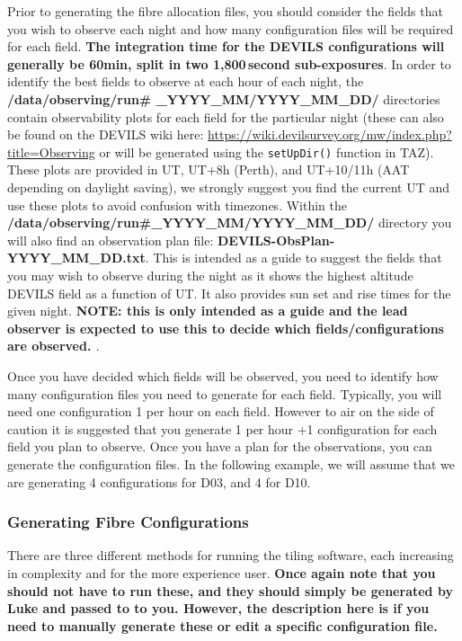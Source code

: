 \documentclass[12pt]{article}
\begin{document}
Prior to generating the fibre allocation files, you should consider the fields that you wish to observe each night and how many configuration files will be required for each field. \textbf{The integration time for the DEVILS configurations will generally be 60min, split in two 1,800\,second sub-exposures}. In order to identify the best fields to observe at each hour of each night, the \textbf{/data/observing/run\# \_YYYY\_MM/YYYY\_MM\_DD/} directories contain observability plots for each field for the particular night (these can also be found on the DEVILS wiki here: \url{https://wiki.devilsurvey.org/mw/index.php?title=Observing} or will be generated using the \texttt{setUpDir()} function in TAZ). These plots are provided in UT, UT+8h (Perth), and UT+10/11h (AAT depending on daylight saving), we strongly suggest you find the current UT and use these plots to avoid confusion with timezones. Within the \textbf{/data/observing/run\#\_YYYY\_MM/YYYY\_MM\_DD/}  directory you will also find an observation plan file: \textbf{DEVILS-ObsPlan-YYYY\_MM\_DD.txt}. This is intended as a guide to suggest the fields that you may wish to observe during the night as it shows the highest altitude DEVILS field as a function of UT. It also provides sun set and rise times for the given night. \textbf{\textcolor{PineGreen}{NOTE:
 this is only intended as a guide and the lead observer is expected to use this to decide which fields/configurations are observed. }}.

Once you have decided which fields will be observed, you need to identify how many configuration files you need to generate for each field. Typically, you will need one configuration 1 per hour on each field. However to air on the side of caution it is suggested that you generate 1 per hour +1 configuration for each field you plan to observe. Once you have a plan for the observations, you can generate the configuration files. In the following example, we will assume that we are generating 4 configurations for D03, and 4 for D10.      


\subsubsection{Generating Fibre Configurations}

There are three different methods for running the tiling software, each increasing in complexity and for the more experience user. \textbf{\textcolor{PineGreen}{Once again note that you should not have to run these, and they should simply be generated by Luke and passed to to you. However, the description here is if you need to manually generate these or edit a specific configuration file.}}\\
\end{document}
